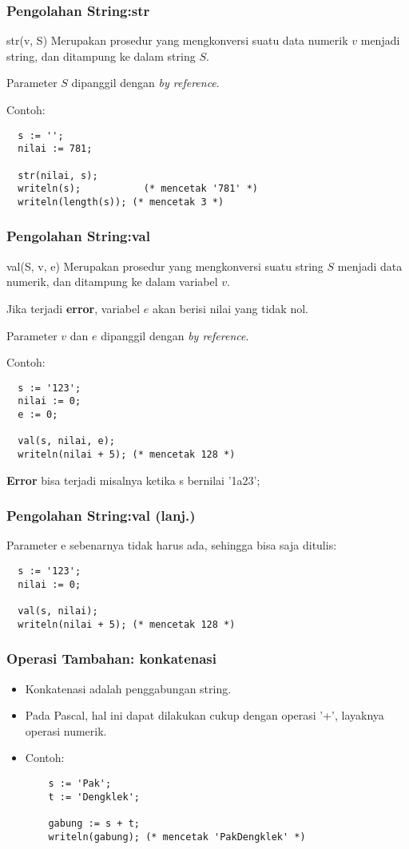\documentclass{beamer}
\begin{document}
\begin{frame}[fragile]
\frametitle{Pengolahan String:\newline str}
\begin{block}{str(v, S)}
Merupakan prosedur yang mengkonversi suatu data numerik $v$ menjadi string, dan ditampung ke dalam string $S$.

Parameter $S$ dipanggil dengan \textit{by reference}.
\end{block}
Contoh:
\begin{lstlisting}
  s := '';
  nilai := 781;

  str(nilai, s);
  writeln(s);           (* mencetak '781' *)
  writeln(length(s)); (* mencetak 3 *)
\end{lstlisting}
\end{frame}

\begin{frame}[fragile]
\frametitle{Pengolahan String:\newline val}
\begin{block}{val(S, v, e)}
Merupakan prosedur yang mengkonversi suatu string $S$ menjadi data numerik, dan ditampung ke dalam variabel $v$.

Jika terjadi \textbf{error}, variabel $e$ akan berisi nilai yang tidak nol.

Parameter $v$ dan $e$ dipanggil dengan \textit{by reference}.
\end{block}
Contoh:
\begin{lstlisting}
  s := '123';
  nilai := 0;
  e := 0;

  val(s, nilai, e);
  writeln(nilai + 5); (* mencetak 128 *)
\end{lstlisting}

\textbf{Error} bisa terjadi misalnya ketika s bernilai '1a23';
\end{frame}

\begin{frame}[fragile]
\frametitle{Pengolahan String:\newline val (lanj.)}
Parameter e sebenarnya tidak harus ada, sehingga bisa saja ditulis:
\begin{lstlisting}
  s := '123';
  nilai := 0;

  val(s, nilai);
  writeln(nilai + 5); (* mencetak 128 *)
\end{lstlisting}
\end{frame}

\begin{frame}[fragile]
\frametitle{Operasi Tambahan: konkatenasi}
\begin{itemize}
  \item Konkatenasi adalah penggabungan string.
  \item Pada Pascal, hal ini dapat dilakukan cukup dengan operasi '+', layaknya operasi numerik.
  \item Contoh:
  \begin{lstlisting}
    s := 'Pak';
    t := 'Dengklek';

    gabung := s + t;
    writeln(gabung); (* mencetak 'PakDengklek' *)
  \end{lstlisting}
\end{itemize}
\end{frame}
\end{document}
